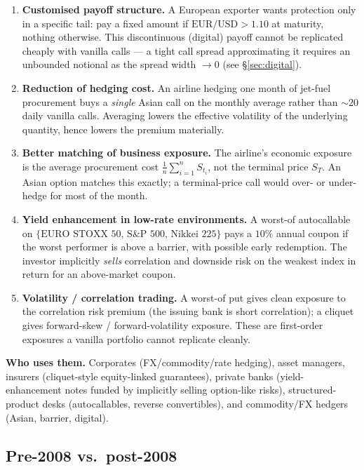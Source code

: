 \documentclass[11pt]{article}
\begin{document}
\begin{enumerate}[label=(\arabic*),leftmargin=2em]
\item \textbf{Customised payoff structure.} A European exporter wants protection only in a specific
tail: pay a fixed amount if $\text{EUR/USD}>1.10$ at maturity, nothing otherwise. This discontinuous
(digital) payoff cannot be replicated cheaply with vanilla calls --- a tight call spread approximating
it requires an unbounded notional as the spread width $\to 0$ (see \S\ref{sec:digital}).

\item \textbf{Reduction of hedging cost.} An airline hedging one month of jet-fuel procurement buys a
\emph{single} Asian call on the monthly average rather than $\sim 20$ daily vanilla calls. Averaging
lowers the effective volatility of the underlying quantity, hence lowers the premium materially.

\item \textbf{Better matching of business exposure.} The airline's economic exposure is the average
procurement cost $\frac1n\sum_{i=1}^n S_{t_i}$, not the terminal price $S_T$. An Asian option matches
this exactly; a terminal-price call would over- or under-hedge for most of the month.

\item \textbf{Yield enhancement in low-rate environments.} A worst-of autocallable on
$\{\text{EURO STOXX 50, S\&P 500, Nikkei 225}\}$ pays a $10\%$ annual coupon if the worst performer is
above a barrier, with possible early redemption. The investor implicitly \emph{sells} correlation and
downside risk on the weakest index in return for an above-market coupon.

\item \textbf{Volatility / correlation trading.} A worst-of put gives clean exposure to the
correlation risk premium (the issuing bank is short correlation); a cliquet gives forward-skew /
forward-volatility exposure. These are first-order exposures a vanilla portfolio cannot replicate cleanly.
\end{enumerate}

\noindent\textbf{Who uses them.} Corporates (FX/commodity/rate hedging), asset managers, insurers
(cliquet-style equity-linked guarantees), private banks (yield-enhancement notes funded by
implicitly selling option-like risks), structured-product desks (autocallables, reverse
convertibles), and commodity/FX hedgers (Asian, barrier, digital).

\subsection*{Pre-2008 vs.\ post-2008}
\end{document}
